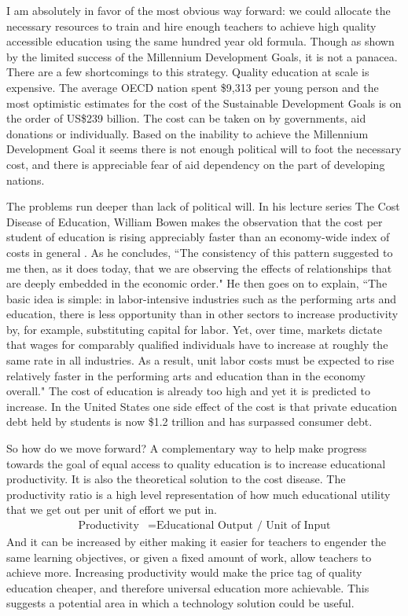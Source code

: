 I am absolutely in favor of the most obvious way forward: we could allocate the necessary resources to train and hire enough teachers to achieve high quality accessible education using the same hundred year old formula. Though as shown by the limited success of the Millennium Development Goals, it is not a panacea. There are a few shortcomings to this strategy. Quality education at scale is expensive. The average OECD nation spent \$9,313 per young person \cite{oecd2014education} and the most optimistic estimates for the cost of the Sustainable Development Goals is on the order of US\$239 billion. The cost can be taken on by governments, aid donations or individually. Based on the inability to achieve the Millennium Development Goal it seems there is not enough political will to foot the necessary cost, and there is appreciable fear of aid dependency on the part of developing nations. 

The problems run deeper than lack of political will. In his lecture series The Cost Disease of Education, William Bowen makes the observation that the cost per student of education is rising appreciably faster than an economy-wide index of costs in general \cite{bowen2012cost}. As he concludes, ``The consistency of this pattern suggested to me then, as it does today, that we are observing the effects of relationships that are deeply embedded in the economic order." He then goes on to explain, ``The basic idea is simple: in labor-intensive industries such as
the performing arts and education, there is less opportunity than in other sectors
to increase productivity by, for example, substituting capital for labor. Yet, over
time, markets dictate that wages for comparably qualified individuals have to
increase at roughly the same rate in all industries. As a result, unit labor costs
must be expected to rise relatively faster in the performing arts and education
than in the economy overall." The cost of education is already too high and yet it is predicted to increase. In the United States one side effect of the cost is that private education debt held by students is now \$1.2 trillion and has surpassed consumer debt. 

So how do we move forward? A complementary way to help make progress towards the goal of equal access to quality education is to increase educational productivity. It is also the theoretical solution to the cost disease. The productivity ratio is a high level representation of how much educational utility that we get out per unit of effort we put in. 
\begin{align*}
\text{Productivity} &= \text{Educational Output / Unit of Input} 
\end{align*}
And it can be increased by either making it easier for teachers to engender the same learning objectives, or given a fixed amount of work, allow teachers to achieve more. Increasing productivity would make the price tag of  quality education cheaper, and therefore universal education more achievable. This suggests a potential area in which a technology solution could be useful. 

